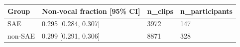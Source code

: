 \begin{tabular}{llll}
\toprule
Group & Non-vocal fraction [95\% CI] & n\_clips & n\_participants \\
\midrule
SAE & 0.295 [0.284, 0.307] & 3972 & 147 \\
non-SAE & 0.299 [0.291, 0.306] & 8871 & 328 \\
\bottomrule
\end{tabular}
